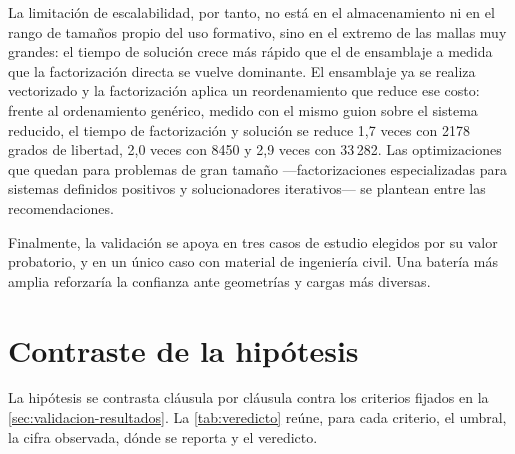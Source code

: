 La limitación de escalabilidad, por tanto, no está en el almacenamiento ni en el rango de tamaños propio del uso formativo, sino en el extremo de las mallas muy grandes: el tiempo de solución crece más rápido que el de ensamblaje a medida que la factorización directa se vuelve dominante. El ensamblaje ya se realiza vectorizado y la factorización aplica un reordenamiento que reduce ese costo: frente al ordenamiento genérico, medido con el mismo guion sobre el sistema reducido, el tiempo de factorización y solución se reduce 1,7 veces con 2178 grados de libertad, 2,0 veces con 8450 y 2,9 veces con 33\,282. Las optimizaciones que quedan para problemas de gran tamaño —factorizaciones especializadas para sistemas definidos positivos y solucionadores iterativos— se plantean entre las recomendaciones.

Finalmente, la validación se apoya en tres casos de estudio elegidos por su valor probatorio, y en un único caso con material de ingeniería civil. Una batería más amplia reforzaría la confianza ante geometrías y cargas más diversas.

\section{Contraste de la hipótesis}
\label{sec:validacion-hipotesis}

La hipótesis se contrasta cláusula por cláusula contra los criterios fijados en la \autoref{sec:validacion-resultados}. La \autoref{tab:veredicto} reúne, para cada criterio, el umbral, la cifra observada, dónde se reporta y el veredicto.

